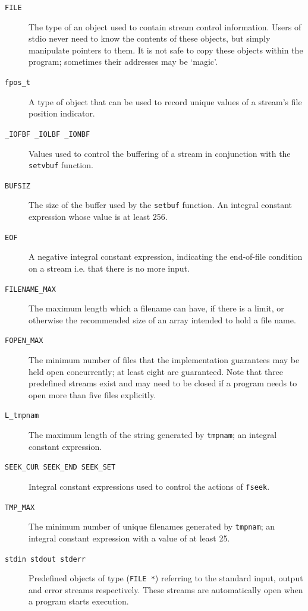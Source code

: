    \begin{description}
    \item[\texttt{FILE}] The type of an object used to contain stream control
     information.  Users of stdio never need to know the
     contents of these objects, but simply manipulate pointers
     to them.  It is not safe to copy these objects within the
     program; sometimes their addresses may be `magic'.

    \item[\texttt{fpos\_t}] A type of object that can be used to record unique values
     of a stream's file position indicator.

    \item[\texttt{\_IOFBF \_IOLBF \_IONBF}] Values used to control the buffering of a stream in
     conjunction with the \texttt{setvbuf} function.

    \item[\texttt{BUFSIZ}] The size of the buffer used by the \texttt{setbuf} function.  An
     integral constant expression whose value is at least 256.

    \item[\texttt{EOF}] A negative integral constant expression, indicating the
     end-of-file condition on a stream i.e. that there is no
     more input.

    \item[\texttt{FILENAME\_MAX}] The maximum length which a filename can have, if there is
     a limit, or otherwise the recommended size of an array
     intended to hold a file name.

    \item[\texttt{FOPEN\_MAX}] The minimum number of files that the implementation
     guarantees may be held open concurrently; at least eight
     are guaranteed.  Note that three predefined streams exist
     and may need to be closed if a program needs to open more
     than five files explicitly.

    \item[\texttt{L\_tmpnam}] The maximum length of the string generated by \texttt{tmpnam}; an
     integral constant expression.

    \item[\texttt{SEEK\_CUR SEEK\_END SEEK\_SET}] Integral constant expressions used to control the actions
     of \texttt{fseek}.

    \item[\texttt{TMP\_MAX}] The minimum number of unique filenames generated by
     \texttt{tmpnam}; an integral constant expression with a value of
     at least 25.

    \item[\texttt{stdin stdout stderr}] Predefined objects of type (\texttt{FILE *}) referring to the
     standard input, output and error streams respectively.
     These streams are automatically open when a program
     starts execution.
   \end{description}

